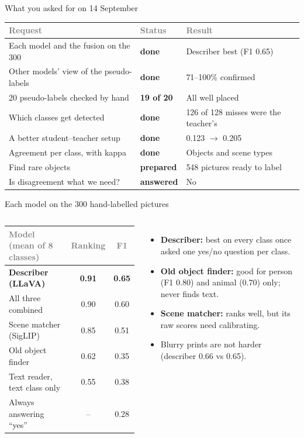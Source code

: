 \documentclass[aspectratio=169,11pt]{beamer}
\newcommand{\yes}[1]{\textcolor{accent}{\textbf{#1}}}
\newcommand{\no}[1]{\textcolor{warn}{\textbf{#1}}}
\newcommand{\h}[1]{\textcolor{grey}{#1}}
\newcommand{\remark}[1]{\par\vspace{0.35cm}{\small\textcolor{grey}{#1}}}
\begin{document}
\begin{frame}{What you asked for on 14 September}
\small
\begin{tabular}{@{}L{5.6cm} L{1.9cm} L{5.2cm}@{}}
\toprule
\h{Request} & \h{Status} & \h{Result}\\
\midrule
Each model and the fusion on the 300 & \yes{done} & Describer best (F1 0.65)\\
Other models' view of the pseudo-labels & \yes{done} & 71--100\% confirmed\\
20 pseudo-labels checked by hand & \no{19 of 20} & All well placed\\
Which classes get detected & \yes{done} & 126 of 128 misses were the teacher's\\
A better student--teacher setup & \yes{done} & 0.123 $\to$ 0.205\\
Agreement per class, with kappa & \yes{done} & Objects and scene types\\
Find rare objects & \no{prepared} & 548 pictures ready to label\\
Is disagreement what we need? & \yes{answered} & No\\
\bottomrule
\end{tabular}
\remark{The text reader is out, so there are 3 models and 3 pairs per class, not 4 and 6.}
\end{frame}

\begin{frame}{Each model on the 300 hand-labelled pictures}
\begin{columns}[T]
\begin{tabular}{@{}l c c@{}}
\toprule
\h{Model (mean of 8 classes)} & \h{Ranking} & \h{F1}\\
\midrule
\textbf{Describer (LLaVA)} & \textbf{0.91} & \textbf{0.65}\\
All three combined & 0.90 & 0.60\\
Scene matcher (SigLIP) & 0.85 & 0.51\\
Old object finder & 0.62 & 0.35\\
Text reader, text class only & 0.55 & 0.38\\
Always answering ``yes'' & -- & 0.28\\
\bottomrule
\end{tabular}
\small
\begin{itemize}\setlength\itemsep{6pt}
  \item \textbf{Describer:} best on every class once asked one yes/no question per class.
  \item \textbf{Old object finder:} good for person (F1 0.80) and animal (0.70) only; never finds text.
  \item \textbf{Scene matcher:} ranks well, but its raw scores need calibrating.
  \item Blurry prints are not harder (describer 0.66 vs 0.65).
\end{itemize}
\end{columns}
\remark{Ranking = AUROC (0.5 coin flip, 1 perfect). Cut-offs chosen by 5-fold cross-validation.}
\end{frame}
\end{document}
